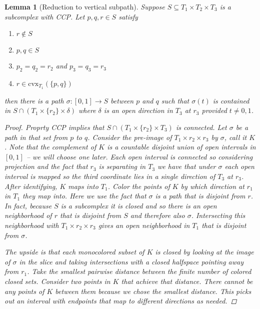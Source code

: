 \documentclass{article}
\theoremstyle{mystyle}
\newtheorem{lem}[thm]{Lemma}
\theoremstyle{remark}
\begin{document}
\begin{lem}
    [Reduction to vertical subpath]
    \label{lem:verticalsubpath} 
    Suppose \(S \subseteq T_{1} \times T_{2} \times T_{3} \) is a subcomplex with CCP. Let \(p,q,r \in S\) satisfy
    \begin{enumerate}
        \item \(r \not\in S\) 
        \item \(p,q \in S\) 
        \item \(p_{2} = q_{2} = r_{2}\) and \(p_{3} = q_{3} =r_{3}\)
        \item \(r \in \text{cvx}_{T_{1}} (\{p,q\}) \) 
    \end{enumerate}
    then there is a path \(\sigma: [0,1] \to S\) between \(p\) and \(q\) such that \(\sigma(t)\) is contained in \(S \cap (T_{1} \times \{r_{2}\} \times \delta)\) where \(\delta\) is an open direction in \(T_{3}\) at \(r_{3}\) provided \(t \neq 0,1\).

    \begin{proof}
        Proprty CCP implies that \(S \cap (T_{1} \times \{r_{2}\} \times T_{3} )\) is connected. Let \(\sigma\) be a path in that set from \(p\) to \(q\). Consider the pre-image of \(T_{1} \times r_{2} \times r_{3}\) by \(\sigma\), call it \(K\). Note that the complement of \(K\) is a countable disjoint union of open intervals in \([0,1]\) -- we will choose one later. Each open interval is connected so considering projection and the fact that \(r_{3}\) is separating in \(T_{3}\) we have that under \(\sigma\) each open interval is mapped so the third coordinate lies in a single direction of \(T_{3}\) at \(r_{3}\). After identifying, \(K\) maps into \(T_{1}\). Color the points of \(K\) by which direction at \(r_1\) in \(T_{1}\) they map into. Here we use the fact that \(\sigma\) is a path that is disjoint from \(r\). In fact, because \(S\) is a subcomplex it is closed and so there is an open neighborhood of \(r\) that is disjoint from \(S\) and therefore also  \(\sigma\). Intersecting this neighborhood with \(T_{1} \times r_{2} \times r_{3}\) gives an open neighborhood in \(T_{1}\) that is disjoint from \(\sigma\). 

        The upside is that each monocolored subset of \(K\) is closed by looking at the image of \(\sigma\) in the slice and taking intersections with a closed halfspace pointing away from \(r_{1}\). Take the smallest pairwise distance between the finite number of colored closed sets. Consider two points in \(K\) that achieve that distance. There cannot be any points of \(K\) between them because we chose the smallest distance. This picks out an interval with endpoints that map to different directions as needed.
     \end{proof}
 

\end{lem}
\end{document}
